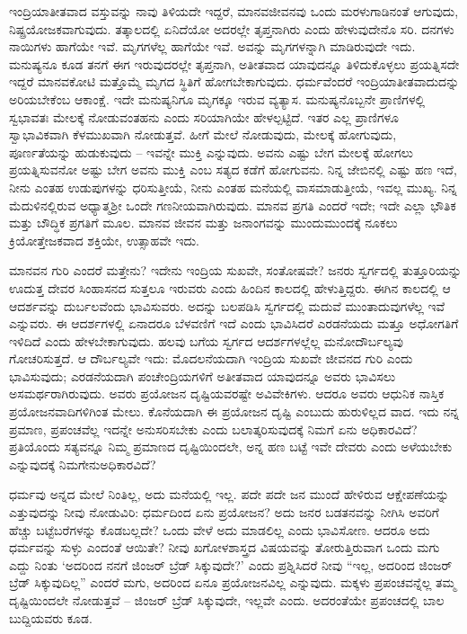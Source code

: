 ಇಂದ್ರಿಯಾತೀತವಾದ ವಸ್ತುವನ್ನು ನಾವು ತಿಳಿಯದೇ ಇದ್ದರೆ, ಮಾನವ\break ಜೀವನವು ಒಂದು ಮರಳುಗಾಡಿನಂತೆ ಆಗುವುದು, ನಿಷ್ಪ್ರಯೋಜಕವಾಗುವುದು. ತತ್ಕಾಲದಲ್ಲಿ ಏನಿದೆಯೋ ಅದರಲ್ಲೇ ತೃಪ್ತನಾಗಿರು ಎಂದು ಹೇಳುವುದೇನೊ ಸರಿ. ದನಗಳು ನಾಯಿಗಳು ಹಾಗೆಯೇ ಇವೆ. ಮೃಗಗಳೆಲ್ಲ ಹಾಗೆಯೇ ಇವೆ. ಅವನ್ನು ಮೃಗಗಳನ್ನಾಗಿ ಮಾಡಿರುವುದೇ ಇದು. ಮನುಷ್ಯನೂ ಕೂಡ ತನಗೆ ಈಗ ಇರುವುದರಲ್ಲೇ ತೃಪ್ತನಾಗಿ, ಅತೀತವಾದ ಯಾವುದನ್ನೂ ತಿಳಿದುಕೊಳ್ಳಲು ಪ್ರಯತ್ನಿಸದೇ ಇದ್ದರೆ ಮಾನವಕೋಟಿ ಮತ್ತೊಮ್ಮೆ ಮೃಗದ ಸ್ಥಿತಿಗೆ ಹೋಗಬೇಕಾಗುವುದು. ಧರ್ಮವೆಂದರೆ ಇಂದ್ರಿಯಾತೀತವಾದುದನ್ನು ಅರಿಯಬೇಕೆಂಬ ಆಕಾಂಕ್ಷೆ. ಇದೇ ಮನುಷ್ಯನಿಗೂ ಮೃಗಕ್ಕೂ ಇರುವ ವ್ಯತ್ಯಾಸ. ಮನುಷ್ಯನೊಬ್ಬನೇ ಪ್ರಾಣಿಗಳಲ್ಲಿ ಸ್ವಭಾವತಃ ಮೇಲಕ್ಕೆ ನೋಡುವಂತಹನು ಎಂದು ಸರಿಯಾಗಿಯೇ ಹೇಳಲ್ಪಟ್ಟಿದೆ. ಇತರ ಎಲ್ಲ ಪ್ರಾಣಿಗಳೂ ಸ್ವಾಭಾವಿಕವಾಗಿ ಕೆಳಮುಖವಾಗಿ ನೋಡುತ್ತವೆ. ಹೀಗೆ ಮೇಲೆ ನೋಡುವುದು, ಮೇಲಕ್ಕೆ ಹೋಗುವುದು, ಪೂರ್ಣತೆಯನ್ನು ಹುಡುಕುವುದು – ಇವನ್ನೇ ಮುಕ್ತಿ ಎನ್ನುವುದು. ಅವನು ಎಷ್ಟು ಬೇಗ ಮೇಲಕ್ಕೆ ಹೋಗಲು ಪ್ರಯತ್ನಿಸುವನೋ ಅಷ್ಟು ಬೇಗ ಅವನು ಮುಕ್ತಿ ಎಂಬ ಸತ್ಯದ ಕಡೆಗೆ ಹೋಗುವನು. ನಿನ್ನ ಜೇಬಿನಲ್ಲಿ ಎಷ್ಟು ಹಣ ಇದೆ, ನೀನು ಎಂತಹ ಉಡುಪುಗಳನ್ನು ಧರಿಸುತ್ತೀಯೆ, ನೀನು ಎಂತಹ ಮನೆಯಲ್ಲಿ ವಾಸಮಾಡುತ್ತೀಯೆ, ಇವಲ್ಲ ಮುಖ್ಯ. ನಿನ್ನ ಮೆದುಳಿನಲ್ಲಿರುವ ಅಧ್ಯಾತ್ಮಶ‍್ರೀ ಒಂದೇ ಗಣನೀಯವಾಗಿರುವುದು. ಮಾನವ ಪ್ರಗತಿ ಎಂದರೆ ಇದೇ; ಇದೇ ಎಲ್ಲಾ ಭೌತಿಕ ಮತ್ತು ಬೌದ್ಧಿಕ ಪ್ರಗತಿಗೆ ಮೂಲ. ಮಾನವ ಜೀವನ ಮತ್ತು ಜನಾಂಗವನ್ನು ಮುಂದುಮುಂದಕ್ಕೆ ನೂಕಲು ಕ್ರಿಯೋತ್ತೇಜಕವಾದ ಶಕ್ತಿಯೇ, ಉತ್ಸಾಹವೇ ಇದು.

ಮಾನವನ ಗುರಿ ಎಂದರೆ ಮತ್ತೇನು? ಇದೇನು ಇಂದ್ರಿಯ ಸುಖವೇ, ಸಂತೋಷವೇ? ಜನರು ಸ್ವರ್ಗದಲ್ಲಿ ತುತ್ತೂರಿಯನ್ನು ಊದುತ್ತ ದೇವರ ಸಿಂಹಾಸನದ ಸುತ್ತಲೂ ಇರುವರು ಎಂದು ಹಿಂದಿನ ಕಾಲದಲ್ಲಿ ಹೇಳುತ್ತಿದ್ದರು. ಈಗಿನ ಕಾಲದಲ್ಲಿ ಆ ಆದರ್ಶವನ್ನು ದುರ್ಬಲವೆಂದು ಭಾವಿಸುವರು. ಅದನ್ನು ಬಲಪಡಿಸಿ ಸ್ವರ್ಗದಲ್ಲಿ ಮದುವೆ ಮುಂತಾದುವುಗಳೆಲ್ಲ ಇವೆ ಎನ್ನುವರು. ಈ ಆದರ್ಶಗಳಲ್ಲಿ ಏನಾದರೂ ಬೆಳವಣಿಗೆ ಇದೆ ಎಂದು ಭಾವಿಸಿದರೆ ಎರಡನೆಯದು ಮತ್ತೂ ಅಧೋಗತಿಗೆ ಇಳಿದಿದೆ ಎಂದು ಹೇಳಬೇಕಾಗುವುದು. ಹಲವು ಬಗೆಯ ಸ್ವರ್ಗದ ಆದರ್ಶಗಳಲ್ಲೆಲ್ಲ ಮನೋದೌರ್ಬಲ್ಯವು ಗೋಚರಿಸುತ್ತದೆ. ಆ ದೌರ್ಬಲ್ಯವೇ ಇದು: ಮೊದಲನೆಯದಾಗಿ ಇಂದ್ರಿಯ ಸುಖವೇ ಜೀವನದ ಗುರಿ ಎಂದು ಭಾವಿಸುವುದು; ಎರಡನೆಯದಾಗಿ ಪಂಚೇಂದ್ರಿಯಗಳಿಗೆ ಅತೀತವಾದ ಯಾವುದನ್ನೂ ಅವರು ಭಾವಿಸಲು ಅಸಮರ್ಥರಾಗಿರುವುದು. ಅವರು ಪ್ರಯೋಜನ ದೃಷ್ಟಿಯವರಷ್ಟೇ ಅವಿವೇಕಿಗಳು. ಆದರೂ ಅವರು ಆಧುನಿಕ ನಾಸ್ತಿಕ ಪ್ರಯೋಜನವಾದಿಗಳಿಗಿಂತ ಮೇಲು. ಕೊನೆಯದಾಗಿ ಈ ಪ್ರಯೋಜನ ದೃಷ್ಟಿ ಎಂಬುದು ಹುರುಳಿಲ್ಲದ ವಾದ. ಇದು ನನ್ನ ಪ್ರಮಾಣ, ಪ್ರಪಂಚವೆಲ್ಲ ಇದನ್ನೇ ಅನುಸರಿಸಬೇಕು ಎಂದು ಬಲಾತ್ಕರಿಸುವುದಕ್ಕೆ ನಿಮಗೆ ಏನು ಅಧಿಕಾರವಿದೆ? ಪ್ರತಿಯೊಂದು ಸತ್ಯವನ್ನೂ ನಿಮ್ಮ ಪ್ರಮಾಣದ ದೃಷ್ಟಿಯಿಂದಲೇ, ಅನ್ನ ಹಣ ಬಟ್ಟೆ ಇವೇ ದೇವರು ಎಂದು ಅಳೆಯಬೇಕು ಎನ್ನುವುದಕ್ಕೆ ನಿಮಗೇನು\break ಅಧಿಕಾರವಿದೆ?

ಧರ್ಮವು ಅನ್ನದ ಮೇಲೆ ನಿಂತಿಲ್ಲ, ಅದು ಮನೆಯಲ್ಲಿ ಇಲ್ಲ. ಪದೇ ಪದೇ ಜನ ಮುಂದೆ ಹೇಳಿರುವ ಆಕ್ಷೇಪಣೆಯನ್ನು ಎತ್ತುವುದನ್ನು ನೀವು ನೋಡುವಿರಿ: ಧರ್ಮದಿಂದ ಏನು ಪ್ರಯೋಜನ? ಅದು ಜನರ ಬಡತನವನ್ನು ನೀಗಿಸಿ ಅವರಿಗೆ ಹೆಚ್ಚು ಬಟ್ಟೆಬರೆಗಳನ್ನು ಕೊಡಬಲ್ಲದೇ? ಒಂದು ವೇಳೆ ಅದು ಮಾಡಲಿಲ್ಲ ಎಂದು ಭಾವಿಸೋಣ. ಆದರೂ ಅದು ಧರ್ಮವನ್ನು ಸುಳ್ಳು ಎಂದಂತೆ ಆಯಿತೇ? ನೀವು ಖಗೋಳಶಾಸ್ತ್ರದ ವಿಷಯವನ್ನು ತೋರುತ್ತಿರುವಾಗ ಒಂದು ಮಗು ಎದ್ದು ನಿಂತು `ಅದರಿಂದ ನನಗೆ ಜಿಂಜರ್ ಬ್ರೆಡ್ ಸಿಕ್ಕುವುದೇ?' ಎಂದು ಪ್ರಶ್ನಿಸಿದರೆ ನೀವು “ಇಲ್ಲ, ಅದರಿಂದ ಜಿಂಜರ್ ಬ್ರೆಡ್ ಸಿಕ್ಕುವುದಿಲ್ಲ” ಎಂದರೆ ಮಗು, ಅದರಿಂದ ಏನೂ ಪ್ರಯೋಜನವಿಲ್ಲ ಎನ್ನುವುದು. ಮಕ್ಕಳು ಪ್ರಪಂಚವನ್ನೆಲ್ಲ ತಮ್ಮ ದೃಷ್ಟಿಯಿಂದಲೇ ನೋಡುತ್ತವೆ – ಜಿಂಜರ್ ಬ್ರೆಡ್ ಸಿಕ್ಕುವುದೇ, ಇಲ್ಲವೇ ಎಂದು. ಅದರಂತೆಯೇ ಪ್ರಪಂಚದಲ್ಲಿ ಬಾಲ ಬುದ್ದಿಯವರು ಕೂಡ.


